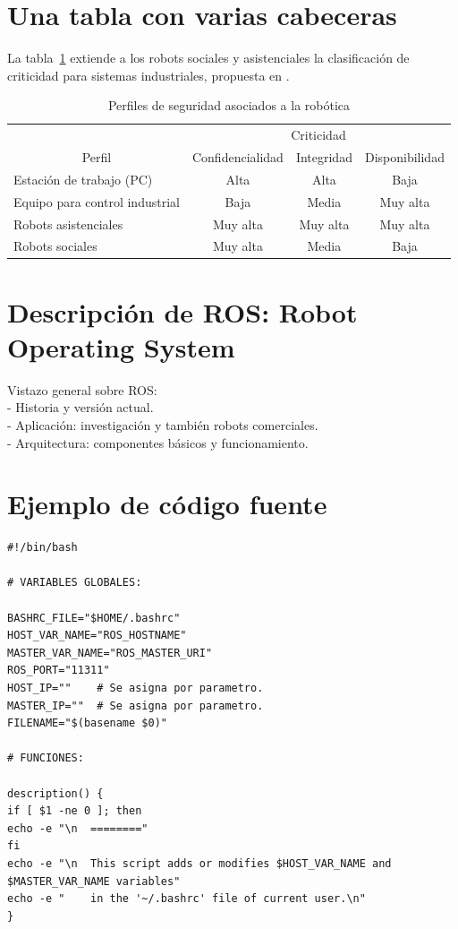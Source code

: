\documentclass[12pt,a4paper,onecolumn,oneside]{report}
\begin{document}
\section*{Una tabla con varias cabeceras}
\label{Ciberseguridad robótica}

La tabla~\ref{tabla1} extiende a los robots sociales y asistenciales la clasificación de criticidad para sistemas industriales, propuesta en \cite{CSSP}.

\begin{table}[ht]
	\centering
	\caption{Perfiles de seguridad asociados a la robótica}
	\label{tabla1}
	\begin{tabular}{|l|ccc|}
		\cline{2-4}
		\multicolumn{1}{c}{} & \multicolumn{3}{|c|}{Criticidad} \\
		\cline{1-4}
		\multicolumn{1}{|c|}{Perfil} &  Confidencialidad & Integridad & Disponibilidad \\ \hline
		Estación de trabajo (PC) & Alta & Alta 	&  Baja \\
		Equipo para control industrial & Baja & Media & Muy alta \\
		Robots asistenciales & Muy alta & Muy alta & Muy alta \\
		Robots sociales & Muy alta & Media & Baja \\ \hline
	\end{tabular}
\end{table}


\section*{Descripción de ROS: Robot Operating System}
\label{ROS}

Vistazo general sobre ROS:\\
- Historia y versión actual.\\
- Aplicación: investigación y también robots comerciales.\\
- Arquitectura: componentes básicos y funcionamiento.


\section*{Ejemplo de código fuente}

\vspace{0.5cm}  %

\begin{lstlisting}
#!/bin/bash

# VARIABLES GLOBALES:

BASHRC_FILE="$HOME/.bashrc"
HOST_VAR_NAME="ROS_HOSTNAME"
MASTER_VAR_NAME="ROS_MASTER_URI"
ROS_PORT="11311"
HOST_IP=""    # Se asigna por parametro.
MASTER_IP=""  # Se asigna por parametro.
FILENAME="$(basename $0)"

# FUNCIONES:

description() {
if [ $1 -ne 0 ]; then
echo -e "\n  ========"
fi
echo -e "\n  This script adds or modifies $HOST_VAR_NAME and $MASTER_VAR_NAME variables"
echo -e "    in the '~/.bashrc' file of current user.\n"
}
\end{lstlisting}
\end{document}
